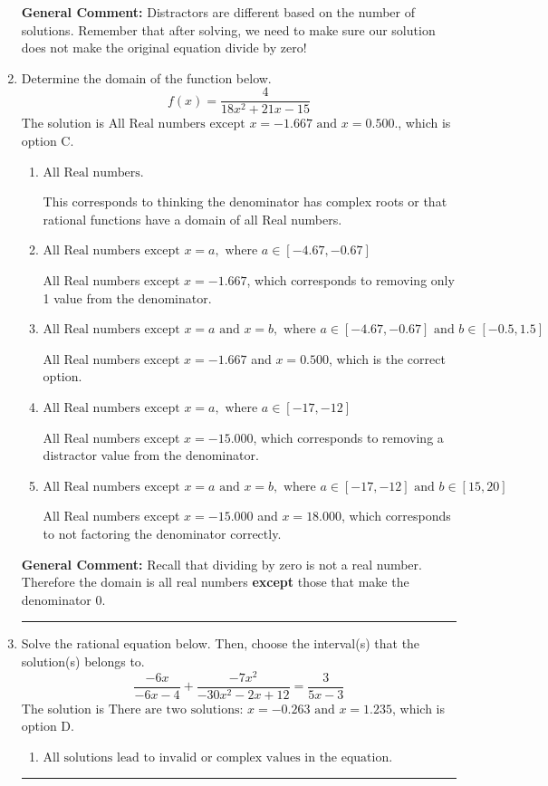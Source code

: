 \documentclass{extbook}[14pt]
\newcommand{\litem}[1]{\item #1

\rule{\textwidth}{0.4pt}}
\begin{document}
\begin{enumerate}
{\begin{enumerate}[label=\Alph*.]
\end{enumerate}

\textbf{General Comment:} Distractors are different based on the number of solutions. Remember that after solving, we need to make sure our solution does not make the original equation divide by zero!
}
\litem{
Determine the domain of the function below.
\[ f(x) = \frac{4}{18x^{2} +21 x -15} \]The solution is \( \text{All Real numbers except } x = -1.667 \text{ and } x = 0.500. \), which is option C.\begin{enumerate}[label=\Alph*.]
\item \( \text{All Real numbers.} \)

This corresponds to thinking the denominator has complex roots or that rational functions have a domain of all Real numbers.
\item \( \text{All Real numbers except } x = a, \text{ where } a \in [-4.67, -0.67] \)

All Real numbers except $x = -1.667$, which corresponds to removing only 1 value from the denominator.
\item \( \text{All Real numbers except } x = a \text{ and } x = b, \text{ where } a \in [-4.67, -0.67] \text{ and } b \in [-0.5, 1.5] \)

All Real numbers except $x = -1.667$ and $x = 0.500$, which is the correct option.
\item \( \text{All Real numbers except } x = a, \text{ where } a \in [-17, -12] \)

All Real numbers except $x = -15.000$, which corresponds to removing a distractor value from the denominator.
\item \( \text{All Real numbers except } x = a \text{ and } x = b, \text{ where } a \in [-17, -12] \text{ and } b \in [15, 20] \)

All Real numbers except $x = -15.000$ and $x = 18.000$, which corresponds to not factoring the denominator correctly.
\end{enumerate}

\textbf{General Comment:} Recall that dividing by zero is not a real number. Therefore the domain is all real numbers \textbf{except} those that make the denominator 0.
}
\litem{
Solve the rational equation below. Then, choose the interval(s) that the solution(s) belongs to.
\[ \frac{-6x}{-6x -4} + \frac{-7x^{2}}{-30x^{2} -2 x + 12} = \frac{3}{5x -3} \]The solution is \( \text{There are two solutions: } x = -0.263 \text{ and } x = 1.235 \), which is option D.\begin{enumerate}[label=\Alph*.]
\item \( \text{All solutions lead to invalid or complex values in the equation.} \)



\end{enumerate}}
\end{enumerate}
\end{document}
